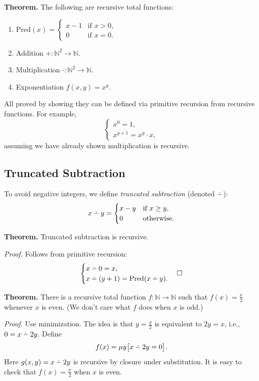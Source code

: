 \documentclass[11pt]{article}
\newcommand{\dotminus}{\mathbin{\ooalign{\hidewidth\raise0.5ex\hbox{$\cdot$}\hidewidth\cr$-$\cr}}}
\begin{document}
\textbf{Theorem.} The following are recursive total functions:
\begin{enumerate}[leftmargin=1.8em, label=\arabic*)]
    \item $\mathrm{Pred}(x) = \begin{cases} x - 1 & \text{if } x > 0, \\ 0 & \text{if } x = 0. \end{cases}$
    \item Addition $+\colon \mathbb{N}^2 \to \mathbb{N}$.
    \item Multiplication $\cdot\colon \mathbb{N}^2 \to \mathbb{N}$.
    \item Exponentiation $f(x, y) = x^y$.
\end{enumerate}
All proved by showing they can be defined via primitive recursion from recursive functions. For example,
\[
    \begin{cases} x^0 = 1, \\ x^{y+1} = x^y \cdot x, \end{cases}
\]
assuming we have already shown multiplication is recursive.

\subsection{Truncated Subtraction}

To avoid negative integers, we define \emph{truncated subtraction} (denoted $\dotminus$):
\[
    x \dotminus y = \begin{cases} x - y & \text{if } x \ge y, \\ 0 & \text{otherwise.} \end{cases}
\]

\textbf{Theorem.} Truncated subtraction is recursive.

\textit{Proof.} Follows from primitive recursion:
\[
    \begin{cases} x \dotminus 0 = x, \\ x \dotminus (y+1) = \mathrm{Pred}(x \dotminus y). \end{cases} \hfill\square
\]

\textbf{Theorem.} There is a recursive total function $f\colon \mathbb{N} \to \mathbb{N}$ such that $f(x) = \frac{x}{2}$ whenever $x$ is even. (We don't care what $f$ does when $x$ is odd.)

\textit{Proof.} Use minimization. The idea is that $y = \frac{x}{2}$ is equivalent to $2y = x$, i.e., $0 = x \dotminus 2y$. Define
\[
    f(x) = \mu y\bigl[x \dotminus 2y = 0\bigr].
\]
Here $g(x, y) = x \dotminus 2y$ is recursive by closure under substitution. It is easy to check that $f(x) = \frac{x}{2}$ when $x$ is even.
\end{document}
